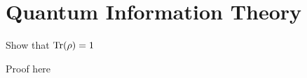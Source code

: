 \documentclass{article}
\begin{document}
\section{Quantum Information Theory}

\begin{exercise}
Show that $\mathrm{Tr}(\rho)=1$
\end{exercise}

\begin{solution}
Proof here
\end{solution}
\end{document}
